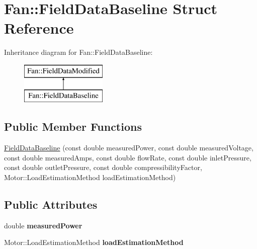 \hypertarget{struct_fan_1_1_field_data_baseline}{}\section{Fan\+:\+:Field\+Data\+Baseline Struct Reference}
\label{struct_fan_1_1_field_data_baseline}
Inheritance diagram for Fan\+:\+:Field\+Data\+Baseline\+:\begin{figure}[H]
\begin{center}
\leavevmode
\includegraphics[height=2.000000cm]{d1/d33/struct_fan_1_1_field_data_baseline}
\end{center}
\end{figure}
\subsection*{Public Member Functions}
\begin{DoxyCompactItemize}
\item 
\hyperlink{struct_fan_1_1_field_data_baseline_a99f4a04d6960b3fe664b991581da87d3}{Field\+Data\+Baseline} (const double measured\+Power, const double measured\+Voltage, const double measured\+Amps, const double flow\+Rate, const double inlet\+Pressure, const double outlet\+Pressure, const double compressibility\+Factor, Motor\+::\+Load\+Estimation\+Method load\+Estimation\+Method)
\end{DoxyCompactItemize}
\subsection*{Public Attributes}
\begin{DoxyCompactItemize}
\item 
\mbox{\label{struct_fan_1_1_field_data_baseline_a72db904713df81b8c4e8edc5555e9061}} 
double {\bfseries measured\+Power}
\item 
\mbox{\label{struct_fan_1_1_field_data_baseline_ad30a17fe79073102a5290a1edd0ac3e9}} 
Motor\+::\+Load\+Estimation\+Method {\bfseries load\+Estimation\+Method}
\end{DoxyCompactItemize}


